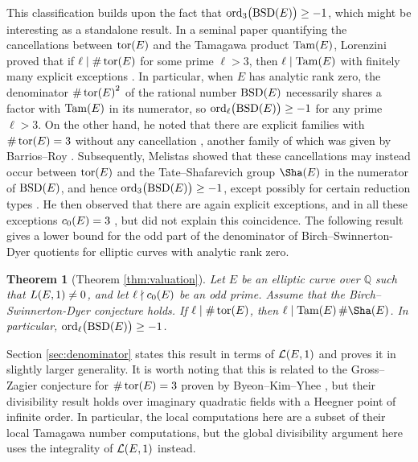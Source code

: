\documentclass{article}
\theoremstyle{plain}
\newtheorem{theorem}[n]{Theorem}
\theoremstyle{definition}
\newcommand{\BSD}{\operatorname{BSD}}
\newcommand{\LLL}{\mathcal{L}}
\newcommand{\ord}{\operatorname{ord}}
\newcommand{\QQ}{\mathbb{Q}}
\newcommand{\Tam}{\operatorname{Tam}}
\newcommand{\tor}{\operatorname{tor}}
\newcommand{\br}{\!\del}
\begin{document}
This classification builds upon the fact that $ \ord_3\br{\BSD\br{E}} \ge -1 $, which might be interesting as a standalone result. In a seminal paper quantifying the cancellations between $ \tor\br{E} $ and the Tamagawa product $ \Tam\br{E} $, Lorenzini proved that if $ \ell \mid \#\tor\br{E} $ for some prime $ \ell > 3 $, then $ \ell \mid \Tam\br{E} $ with finitely many explicit exceptions \cite[Proposition 1.1]{Lor11}. In particular, when $ E $ has analytic rank zero, the denominator $ \#\tor\br{E}^2 $ of the rational number $ \BSD\br{E} $ necessarily shares a factor with $ \Tam\br{E} $ in its numerator, so $ \ord_\ell\br{\BSD\br{E}} \ge -1 $ for any prime $ \ell > 3 $. On the other hand, he noted that there are explicit families with $ \#\tor\br{E} = 3 $ without any cancellation \cite[Lemma 2.26]{Lor11}, another family of which was given by Barrios--Roy \cite[Corollary 5.1]{BR22}. Subsequently, Melistas showed that these cancellations may instead occur between $ \tor\br{E} $ and the Tate--Shafarevich group $ \Sha\br{E} $ in the numerator of $ \BSD\br{E} $, and hence $ \ord_3\br{\BSD\br{E}} \ge -1 $, except possibly for certain reduction types \cite[Theorem 1.4]{Mel23}. He then observed that there are again explicit exceptions, and in all these exceptions $ c_0\br{E} = 3 $ \cite[Example 3.8]{Mel23}, but did not explain this coincidence. The following result gives a lower bound for the odd part of the denominator of Birch--Swinnerton-Dyer quotients for elliptic curves with analytic rank zero.

\begin{theorem}[Theorem \ref{thm:valuation}]
Let $ E $ be an elliptic curve over $ \QQ $ such that $ L\br{E, 1} \ne 0 $, and let $ \ell \nmid c_0\br{E} $ be an odd prime. Assume that the Birch--Swinnerton-Dyer conjecture holds. If $ \ell \mid \#\tor\br{E} $, then $ \ell \mid \Tam\br{E}\#\Sha\br{E} $. In particular, $ \ord_\ell\br{\BSD\br{E}} \ge -1 $.
\end{theorem}

Section \ref{sec:denominator} states this result in terms of $ \LLL\br{E, 1} $ and proves it in slightly larger generality. It is worth noting that this is related to the Gross--Zagier conjecture for $ \#\tor\br{E} = 3 $ proven by Byeon--Kim--Yhee \cite[Theorem 1.2]{BKY19}, but their divisibility result holds over imaginary quadratic fields with a Heegner point of infinite order. In particular, the local computations here are a subset of their local Tamagawa number computations, but the global divisibility argument here uses the integrality of $ \LLL\br{E, 1} $ instead.
\end{document}
